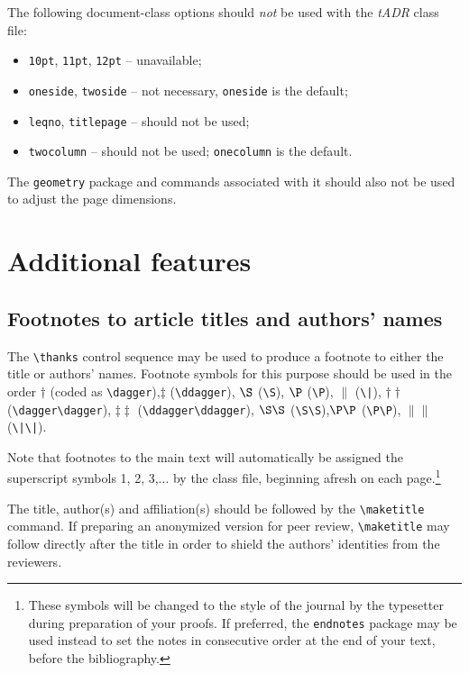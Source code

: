 \documentclass{tADR2e}
\begin{document}
The following document-class options should \emph{not} be used with the {\it tADR} class file:
%
\begin{itemize}
   \item {\tt 10pt}, {\tt 11pt}, {\tt 12pt} -- unavailable;
   \item {\tt oneside}, {\tt twoside} -- not necessary, \texttt{oneside} is the default;
   \item {\tt leqno}, {\tt titlepage} -- should not be used;
   \item {\tt twocolumn} -- should not be used; \texttt{onecolumn} is the default.
\end{itemize}
%
The {\tt geometry} package and commands associated with it should also not be used to adjust the page dimensions.


\section{Additional features}

\subsection{Footnotes to article titles and authors' names}

The \verb"\thanks" control sequence may be used to produce a footnote to either the title or authors' names. Footnote symbols for this purpose should be used in the order $\dagger$ (coded as \verb"\dagger"),\break $\ddagger$ (\verb"\ddagger"), $\S$ (\verb"\S"), $\P$ (\verb"\P"), $\|$ (\verb"\|"), $\dagger\dagger$ (\verb"\dagger\dagger"), $\ddagger\ddagger$ (\verb"\ddagger\ddagger"), $\S\S$ (\verb"\S\S"),\break $\P\P$ (\verb"\P\P"), $\|\|$ (\verb"\|\|").

Note that footnotes to the main text will automatically be assigned the superscript
 symbols 1, 2, 3,... by the class file, beginning afresh on each
page.\footnote{These symbols will be changed to the style of the journal by the
 typesetter during preparation of your proofs. If preferred, the \texttt{endnotes} package
 may be used instead to set the notes in consecutive order at the end
 of your text, before the bibliography.}

The title, author(s) and affiliation(s) should be followed by the {\verb"\maketitle"} command. If preparing an anonymized version for peer review, {\verb"\maketitle"} may follow directly after the title in order to shield the authors' identities from the reviewers.
\end{document}
